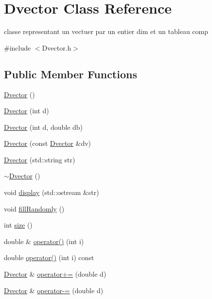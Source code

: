\hypertarget{class_dvector}{}\section{Dvector Class Reference}
\label{class_dvector}


classe representant un vectuer par un entier dim et un tableau comp  




{\ttfamily \#include $<$Dvector.\+h$>$}

\subsection*{Public Member Functions}
\begin{DoxyCompactItemize}
\item 
\hyperlink{class_dvector_adf0f620df0feef3311f7d198e649a298}{Dvector} ()
\item 
\hyperlink{class_dvector_ab1f97c62e226c5ca8638b12151f9da06}{Dvector} (int d)
\item 
\hyperlink{class_dvector_aabd99c919ed6e6a646bdf04e65196c8d}{Dvector} (int d, double db)
\item 
\hyperlink{class_dvector_a0f41b80d21194cf95c63c380abad688a}{Dvector} (const \hyperlink{class_dvector}{Dvector} \&dv)
\item 
\hyperlink{class_dvector_aaad8a83600efdc7f6f21d72e81b95b3d}{Dvector} (std\+::string str)
\item 
\hyperlink{class_dvector_a3156d0776c5da1a15685970200ec6b96}{$\sim$\+Dvector} ()
\item 
void \hyperlink{class_dvector_af66e4bdf60171463c01eea1039eecdb1}{display} (std\+::ostream \&str)
\item 
void \hyperlink{class_dvector_a6fecdca0fbad7f928403597e322234b1}{fill\+Randomly} ()
\item 
int \hyperlink{class_dvector_a964b4f5cc235ba6aaf9c5e437318be87}{size} ()
\item 
double \& \hyperlink{class_dvector_ae355bf2da1777227c39e5687810c1b41}{operator()} (int i)
\item 
double \hyperlink{class_dvector_ab36d783942e527645ae497ff7fe2e038}{operator()} (int i) const 
\item 
\hyperlink{class_dvector}{Dvector} \& \hyperlink{class_dvector_a74de34b0266e8782b2d6ef450a60fddd}{operator+=} (double d)
\item 
\hyperlink{class_dvector}{Dvector} \& \hyperlink{class_dvector_a17fc3cabd576413fc0b414b0737ec4f1}{operator-\/=} (double d)

\end{DoxyCompactItemize}

